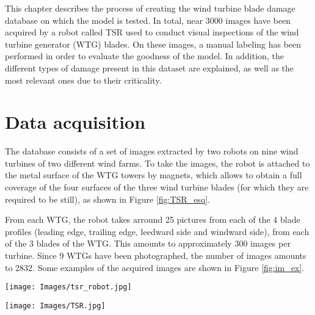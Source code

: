 \label{chapter:2}

This chapter describes the process of creating the wind turbine blade damage database on which the model is tested. In total, near 3000 images have been acquired by a robot called TSR used to conduct visual inspections of the wind turbine generator (WTG) blades. On these images, a manual labeling has been performed in order to evaluate the goodness of the model. In addition, the different types of damage present in this dataset are explained, as well as the most relevant ones due to their criticality.

\section{Data acquisition}
\label{sec:dataAcquisition}

The database consists of a set of images extracted by two robots on nine wind turbines of two different wind farms. To take the images, the robot is attached to the metal surface of the WTG towers by magnets, which allows to obtain a full coverage of the four surfaces of the three wind turbine blades (for which they are required to be still), as shown in Figure \ref{fig:TSR_esq}.

From each WTG, the robot takes arround 25 pictures from each of the 4 blade profiles (leading edge, trailing edge, leedward side and windward side), from each of the 3 blades of the WTG. This amounts to approximately 300 images per turbine. Since 9 WTGs have been photographed, the number of images amounts to 2832. Some examples of the acquired images are shown in Figure \ref{fig:im_ex}.

\begin{figure*}[htbp]
        \centering            
        \texttt{[image: Images/tsr\_robot.jpg]}
        \caption[TSR robot attached to a WTG tower.]
        {\small TSR robot attached to a WTG tower.} 
        \label{fig:TSR_rob}
    \end{figure*}

\begin{figure*}[htbp]
        \centering            
        \texttt{[image: Images/TSR.jpg]}
        \caption[Image acquisition procedure and blade designation.]
        {\small Image acquisition procedure and blade designation.} 
        \label{fig:TSR_esq}
    \end{figure*}

